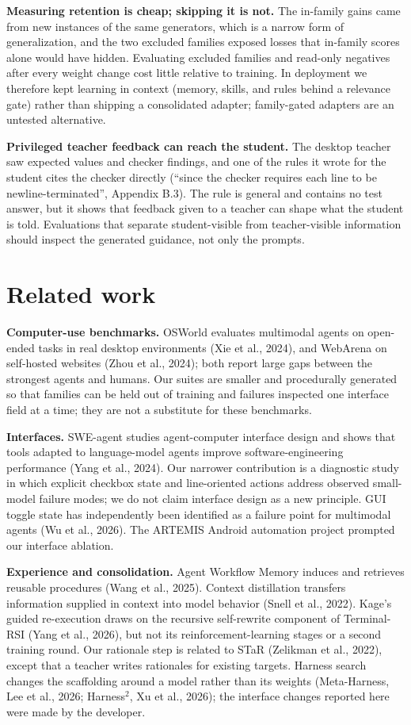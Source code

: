 \documentclass[
  10pt,
]{article}
\begin{document}
\textbf{Measuring retention is cheap; skipping it is not.} The in-family
gains came from new instances of the same generators, which is a narrow
form of generalization, and the two excluded families exposed losses
that in-family scores alone would have hidden. Evaluating excluded
families and read-only negatives after every weight change cost little
relative to training. In deployment we therefore kept learning in
context (memory, skills, and rules behind a relevance gate) rather than
shipping a consolidated adapter; family-gated adapters are an untested
alternative.

\textbf{Privileged teacher feedback can reach the student.} The desktop
teacher saw expected values and checker findings, and one of the rules
it wrote for the student cites the checker directly (``since the checker
requires each line to be newline-terminated'', Appendix B.3). The rule
is general and contains no test answer, but it shows that feedback given
to a teacher can shape what the student is told. Evaluations that
separate student-visible from teacher-visible information should inspect
the generated guidance, not only the prompts.

\section{Related work}\label{related-work}

\textbf{Computer-use benchmarks.} OSWorld evaluates multimodal agents on
open-ended tasks in real desktop environments (Xie et al., 2024), and
WebArena on self-hosted websites (Zhou et al., 2024); both report large
gaps between the strongest agents and humans. Our suites are smaller and
procedurally generated so that families can be held out of training and
failures inspected one interface field at a time; they are not a
substitute for these benchmarks.

\textbf{Interfaces.} SWE-agent studies agent-computer interface design
and shows that tools adapted to language-model agents improve
software-engineering performance (Yang et al., 2024). Our narrower
contribution is a diagnostic study in which explicit checkbox state and
line-oriented actions address observed small-model failure modes; we do
not claim interface design as a new principle. GUI toggle state has
independently been identified as a failure point for multimodal agents
(Wu et al., 2026). The ARTEMIS Android automation project prompted our
interface ablation.

\textbf{Experience and consolidation.} Agent Workflow Memory induces and
retrieves reusable procedures (Wang et al., 2025). Context distillation
transfers information supplied in context into model behavior (Snell et
al., 2022). Kage's guided re-execution draws on the recursive
self-rewrite component of Terminal-RSI (Yang et al., 2026), but not its
reinforcement-learning stages or a second training round. Our rationale
step is related to STaR (Zelikman et al., 2022), except that a teacher
writes rationales for existing targets. Harness search changes the
scaffolding around a model rather than its weights (Meta-Harness, Lee et
al., 2026; Harness\(^2\), Xu et al., 2026); the interface changes
reported here were made by the developer.
\end{document}
